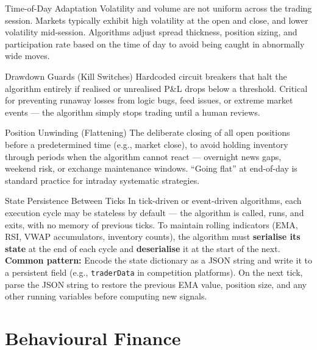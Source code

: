 \begin{keyterm}{Time-of-Day Adaptation}
Volatility and volume are not uniform across the trading session. Markets typically
exhibit high volatility at the open and close, and lower volatility mid-session.
Algorithms adjust spread thickness, position sizing, and participation rate based
on the time of day to avoid being caught in abnormally wide moves.
\end{keyterm}

\begin{keyterm}{Drawdown Guards (Kill Switches)}
Hardcoded circuit breakers that halt the algorithm entirely if realised or unrealised
P\&L drops below a threshold. Critical for preventing runaway losses from logic bugs,
feed issues, or extreme market events — the algorithm simply stops trading until a
human reviews.
\end{keyterm}

\begin{keyterm}{Position Unwinding (Flattening)}
The deliberate closing of all open positions before a predetermined time (e.g., market
close), to avoid holding inventory through periods when the algorithm cannot react —
overnight news gaps, weekend risk, or exchange maintenance windows.
``Going flat'' at end-of-day is standard practice for intraday systematic strategies.
\end{keyterm}

\begin{keyterm}{State Persistence Between Ticks}
In tick-driven or event-driven algorithms, each execution cycle may be stateless by
default — the algorithm is called, runs, and exits, with no memory of previous ticks.
To maintain rolling indicators (EMA, RSI, VWAP accumulators, inventory counts),
the algorithm must \textbf{serialise its state} at the end of each cycle and
\textbf{deserialise} it at the start of the next.
\\\textbf{Common pattern:} Encode the state dictionary as a JSON string and write it
to a persistent field (e.g., \texttt{traderData} in competition platforms). On the
next tick, parse the JSON string to restore the previous EMA value, position size,
and any other running variables before computing new signals.
\end{keyterm}

\section{Behavioural Finance}

